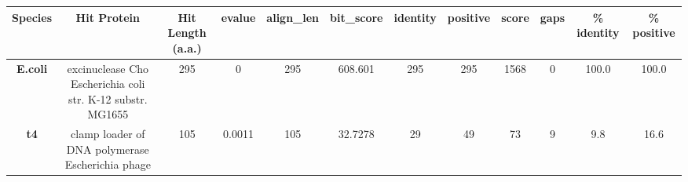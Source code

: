 \begin{tabular}{|c|c|c|c|c|c|c|c|c|c|c|c|} \hline
\textbf{Species} & \textbf{Hit Protein} & \textbf{Hit Length (a.a.)} & \textbf{evalue} & \textbf{align\_len} & \textbf{bit\_score} & \textbf{identity} & \textbf{positive} & \textbf{score} & \textbf{gaps} & \textbf{\% identity} & \textbf{\% positive} \\ \hline
\textbf{E.coli} & excinuclease Cho Escherichia coli str. K-12 substr. MG1655 & 295 & 0 & 295 & 608.601 & 295 & 295 & 1568 & 0 & 100.0 & 100.0\\
\textbf{t4} & clamp loader of DNA polymerase Escherichia phage  & 105 & 0.0011 & 105 & 32.7278 & 29 & 49 & 73 & 9 & 9.8 & 16.6\\
\hline \end{tabular}
